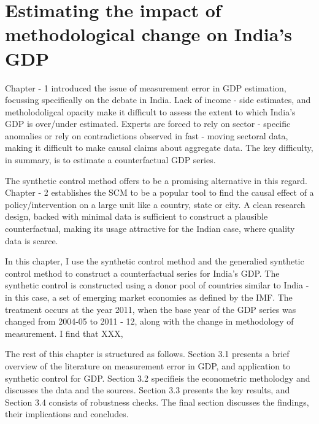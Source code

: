 \documentclass[12pt,nobind, a4paper]{reedthesis}
\begin{document}
 \hypertarget{estimating-the-impact-of-methodological-change-on-indias-gdp}{%
 \chapter{Estimating the impact of methodological change on India's GDP}\label{estimating-the-impact-of-methodological-change-on-indias-gdp}}

 Chapter - 1 introduced the issue of measurement error in GDP estimation, focussing specifically on the debate in India. Lack of income - side estimates, and metholodoligcal opacity make it difficult to assess the extent to which India's GDP is over/under estimated. Experts are forced to rely on sector - specific anomalies or rely on contradictions observed in fast - moving sectoral data, making it difficult to make causal claims about aggregate data. The key difficulty, in summary, is to estimate a counterfactual GDP series.
 \linebreak

 The synthetic control method offers to be a promising alternative in this regard. Chapter - 2 establishes the SCM to be a popular tool to find the causal effect of a policy/intervention on a large unit like a country, state or city. A clean research design, backed with minimal data is sufficient to construct a plausible counterfactual, making its usage attractive for the Indian case, where quality data is scarce.
 \linebreak

 In this chapter, I use the synthetic control method and the generalied synthetic control method to construct a counterfactual series for India's GDP. The synthetic control is constructed using a donor pool of countries similar to India - in this case, a set of emerging market economies as defined by the IMF. The treatment occurs at the year 2011, when the base year of the GDP series was changed from 2004-05 to 2011 - 12, along with the change in methodology of measurement. I find that XXX,
 \linebreak

 The rest of this chapter is structured as follows. Section 3.1 presents a brief overview of the literature on measurement error in GDP, and application to synthetic control for GDP. Section 3.2 specifieis the econometric metholodgy and discusses the data and the sources. Section 3.3 presents the key results, and Section 3.4 consists of robustness checks. The final section discusses the findings, their implications and concludes.
\end{document}
